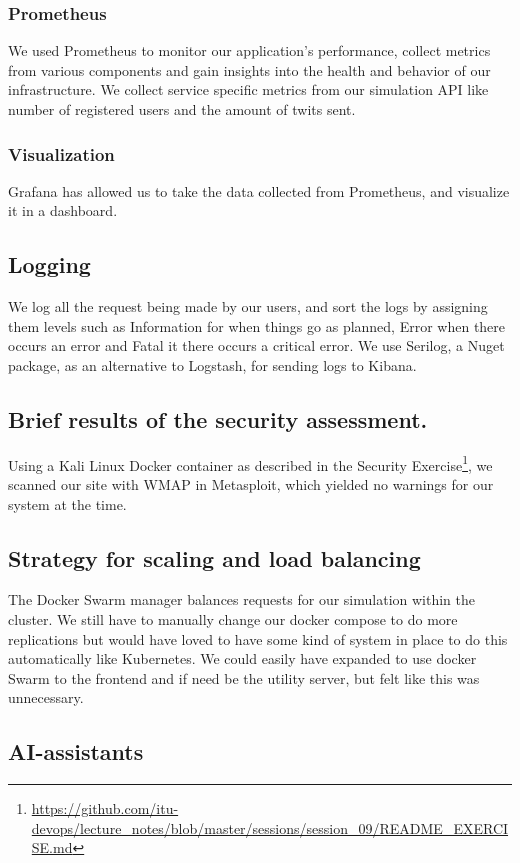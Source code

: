 \subsubsection{Prometheus}
We used Prometheus to monitor our application's performance, collect metrics from various components and gain insights into the health and behavior of our infrastructure.
We collect service specific metrics from our simulation API like number of registered users and the amount of twits sent. 

\subsubsection{Visualization}
Grafana has allowed us to take the data collected from Prometheus, and visualize it in a dashboard.

\subsection{Logging}
We log all the request being made by our users, and sort the logs by assigning them levels such as Information for when things go as planned, Error when there occurs an error and Fatal it there occurs a critical error. We use Serilog, a Nuget package, as an alternative to Logstash, for sending logs to Kibana.

\subsection{
Brief results of the security assessment.}
Using a Kali Linux Docker container as described in the Security Exercise\footnote{\url{https://github.com/itu-devops/lecture_notes/blob/master/sessions/session_09/README_EXERCISE.md}}, we scanned our site with WMAP in Metasploit, which yielded no warnings for our system at the time. 
\subsection{Strategy for scaling and load balancing}
The Docker Swarm manager balances requests for our simulation within the cluster.\cite{dockerswarm} We still have to manually change our docker compose to do more replications but would have loved to have some kind of system in place to do this automatically like Kubernetes. We could easily have expanded to use docker Swarm  to the frontend and if need be the utility server, but felt like this was unnecessary.




\subsection{AI-assistants}

